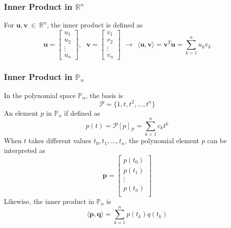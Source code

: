 \documentclass[11pt]{article}
\begin{document}
\subsubsection*{Inner Product in $\bm{\mathbb{R}}^n$}
For $\bm{u}, \bm{v}~\in~\mathbb{R}^n$, the inner product is defined as
\begin{equation}
    \bm{u} = \begin{bmatrix} u_1 \\ u_2 \\ \vdots \\ u_n
    \end{bmatrix},~~~\bm{v} = \begin{bmatrix}
    v_1 \\ v_2 \\ \vdots \\ v_n
    \end{bmatrix}~~\rightarrow~~\langle \bm{u},\bm{v} \rangle = \bm{v}^T\bm{u} = \sum_{k=1}^n u_kv_k 
\end{equation}
\subsubsection*{Inner Product in $\mathbb{P}_n$}
In the polynomial space $\mathbb{P}_{n}$, the basis is
\begin{equation}
    \mathcal{P} = \{1, t, t^2, \dots , t^n\}
\end{equation}
An element $p$ in $\mathbb{P}_n$ if defined as
\begin{equation}
    p(t) = \mathcal{P}[p]_{\mathcal{P}} = \sum_{k=1}^n c_k t^k
\end{equation}
When $t$ takes different values $t_0, t_1, \dots, t_n$, the polynomial element $p$ can be interpreted as
\begin{equation}
    \bm{p} = \begin{bmatrix}
    p(t_0) \\ p(t_1) \\ \vdots \\ p(t_n) \\
    \end{bmatrix}
\end{equation}
Likewise, the inner product in $\mathbb{P}_n$ is
\begin{equation}
    \langle \bm{p},\bm{q} \rangle = \sum_{k=1}^n p(t_k)q(t_k)
\end{equation}
\end{document}
